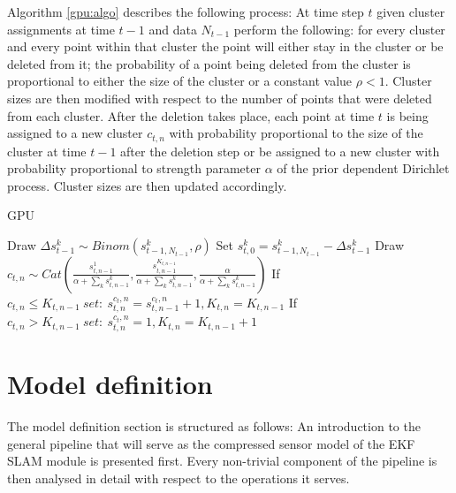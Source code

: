 \documentclass[twoside,hidelinks]{article}
\begin{document}
Algorithm \ref{gpu:algo} describes the following process: At time step $t$ given cluster assignments at time $t-1$ and data $N_{t-1}$ perform the following: for every cluster and every point within that cluster the point will either stay in the cluster or be deleted from it; the probability of a point being deleted from the cluster is proportional to either the size of the cluster or a constant value $\rho <1$\cite{caron}. Cluster sizes are then modified with respect to the number of points that were deleted from each cluster. After the deletion takes place, each point at time $t$ is being assigned to a new cluster $c_{t,n}$  with probability proportional to the size of the cluster at time $t-1$ after the deletion step or be assigned to a new cluster with probability proportional to strength parameter $\alpha$ of the prior dependent Dirichlet process. Cluster sizes are then updated accordingly.

\begin{algorithm}
  \caption{GPU}\label{GPU}
  \begin{algorithmic}[1]

	      \State Draw $\Delta s_{t-1}^k \sim Binom(s_{t-1,N_{t-1}}^k, \rho) $ 
	      \State Set $s_{t,0}^{k} = s_{t-1,N_{t-1}}^{k} -\Delta s_{t-1}^k$
      \EndFor
      	    \State Draw $c_{t,n} \sim Cat( \frac{ s_{t,n-1}^{1} }{\alpha + \sum_k s_{t,n-1}^{k} }, \frac{ s_{t,n-1}^{K_{t,n-1}} }{\alpha + \sum_k s_{t,n-1}^{k} } , \frac{ \alpha}{\alpha + \sum_k s_{t,n-1}^{k} }) $
      	    \State If $c_{t,n} \leq K_{t,n-1}\ set:\ s_{t,n}^{c_t,n} = s_{t,n-1}^{c_t,n} + 1 , K_{t,n} = K_{t,n-1}$
      	    \State If $c_{t,n} > K_{t,n-1}\ set:\ s_{t,n}^{c_t,n} = 1 , K_{t,n} = K_{t,n-1} + 1$
      \EndFor
    \EndProcedure
  \end{algorithmic}
  \label{gpu:algo}
\end{algorithm}


\newpage
\section{Model definition}
\label{sec:model}

The model definition section is structured as follows: An introduction to the general pipeline that will serve as the compressed sensor model of the EKF SLAM module is presented first. Every non-trivial component of the pipeline is then analysed in detail with respect to the operations it serves.
\end{document}
